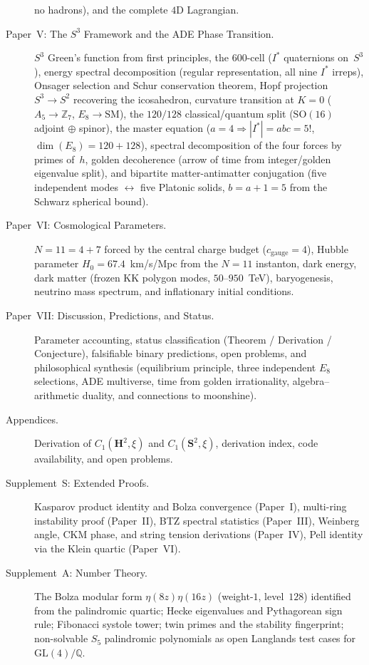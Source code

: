 \begin{description}
  no hadrons), and the complete $4$D Lagrangian.
\item[Paper~V: The $S^3$ Framework and the ADE Phase Transition.]
  $S^3$ Green's function from first principles, the 600-cell
  ($I^*$ quaternions on~$S^3$), energy spectral decomposition
  (regular representation, all nine $I^*$ irreps), Onsager selection
  and Schur conservation theorem, Hopf projection $S^3 \to S^2$
  recovering the icosahedron, curvature transition at $K = 0$
  ($A_5 \to \mathbb{Z}_7$, $E_8 \to \mathrm{SM}$), the
  $120/128$ classical/quantum split ($\mathrm{SO}(16)$
  adjoint $\oplus$ spinor), the master equation
  ($a = 4 \Rightarrow |I^*| = abc = 5!$, $\dim(E_8) = 120 + 128$),
  spectral decomposition of the four forces by primes of~$h$,
  golden decoherence (arrow of time from integer/golden
  eigenvalue split), and bipartite matter-antimatter conjugation
  (five independent modes $\leftrightarrow$ five Platonic solids,
  $b = a{+}1 = 5$ from the Schwarz spherical bound).
\item[Paper~VI: Cosmological Parameters.] $N = 11 = 4 + 7$
  forced by the central charge budget ($c_{\mathrm{gauge}} = 4$),
  Hubble parameter $H_0 = 67.4$~km/s/Mpc from the $N = 11$
  instanton, dark energy, dark matter
  (frozen KK polygon modes, $50$--$950$~TeV), baryogenesis,
  neutrino mass spectrum, and inflationary initial conditions.
\item[Paper~VII: Discussion, Predictions, and Status.] Parameter
  accounting, status classification (Theorem / Derivation / Conjecture),
  falsifiable binary predictions, open problems, and philosophical synthesis
  (equilibrium principle, three independent $E_8$ selections, ADE multiverse,
  time from golden irrationality, algebra--arithmetic duality,
  and connections to moonshine).
\item[Appendices.] Derivation of $C_1(\mathbf{H}^2,\xi)$ and
  $C_1(\mathbf{S}^2,\xi)$, derivation index, code availability,
  and open problems.
\item[Supplement~S: Extended Proofs.]  Kasparov product identity
  and Bolza convergence (Paper~I), multi-ring instability proof
  (Paper~II), BTZ spectral statistics (Paper~III),
  Weinberg angle, CKM phase, and string tension derivations
  (Paper~IV), Pell identity via the Klein quartic (Paper~VI).
\item[Supplement~A: Number Theory.]  The Bolza modular form
  $\eta(8z)\eta(16z)$ (weight-$1$, level~$128$) identified from
  the palindromic quartic; Hecke eigenvalues and Pythagorean
  sign rule; Fibonacci systole tower; twin primes and the
  stability fingerprint; non-solvable $S_5$ palindromic
  polynomials as open Langlands test cases for
  $\mathrm{GL}(4)/\mathbb{Q}$.
\end{description}

